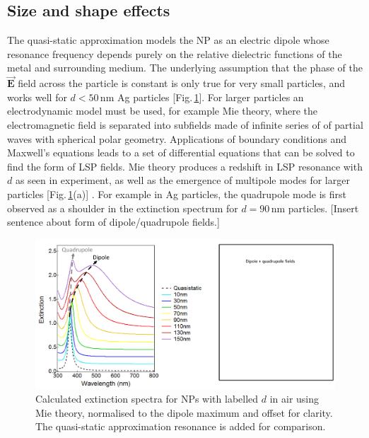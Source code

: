 \subsection{Size and shape effects}
The quasi-static approximation models the NP as an electric dipole whose resonance frequency depends purely on the relative dielectric functions of the metal and surrounding medium. The underlying assumption that the phase of the $\vec{\mathbf{E}}$ field across the particle is constant is only true for very small particles, and works well for $d<50$\,nm Ag particles [Fig.\,\ref{3Fig9}]. For larger particles an electrodynamic model must be used, for example Mie theory, where the electromagnetic field is separated into subfields made of infinite series of of partial waves with spherical polar geometry. Applications of boundary conditions and Maxwell's equations leads to a set of differential equations that can be solved to find the form of LSP fields. Mie theory produces a redshift in LSP resonance with $d$ as seen in experiment, as well as the emergence of multipole modes for larger particles [Fig.\,\ref{3Fig9}(a)] \cite{Maier2007, Born1999}. For example in Ag particles, the quadrupole mode is first observed as a shoulder in the extinction spectrum for $d=90$\,nm particles. [Insert sentence about form of dipole/quadrupole fields.]
\begin{figure}[h!] 
\centering    
\includegraphics[width=\textwidth]{Fig9}
\caption{Calculated extinction spectra for NPs with labelled $d$ in air using Mie theory, normalised to the dipole maximum and offset for clarity. The quasi-static approximation resonance is added for comparison.}
\label{3Fig9}
\end{figure}


